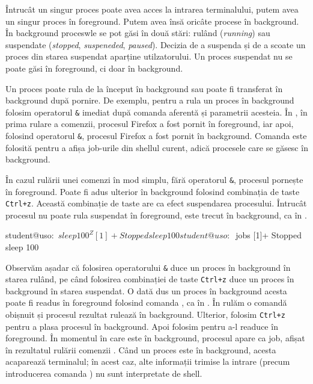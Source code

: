 Întrucât un singur proces poate avea acces la intrarea terminalului, putem avea un singur proces în foreground.
Putem avea însă oricâte procese în background.
În background proceswle se pot găsi în două stări: rulând (\textit{running}) sau suspendate (\textit{stopped}, \textit{suspeneded}, \textit{paused}).
Decizia de a suspenda și de a scoate un proces din starea suspendat aparține utilzatorului.
Un proces suspendat nu se poate găsi în foreground, ci doar în background.

Un proces poate rula de la început în background sau poate fi transferat în background după pornire.
De exemplu, pentru a rula un proces în background folosim operatorul \texttt{\&} imediat după comanda aferentă și parametrii acesteia.
În , în prima rulare a comenzii, procesul Firefox a fost pornit în foreground, iar apoi, folosind operatorul \texttt{\&}, procesul Firefox a fost pornit în background.
Comanda  este folosită pentru a afișa job-urile din shellul curent, adică procesele care se găsesc în background.


În cazul rulării unei comenzi în mod simplu, fără operatorul \texttt{\&}, procesul pornește în foreground.
Poate fi adus ulterior în background folosind combinația de taste \texttt{Ctrl+z}.
Această combinație de taste are ca efect suspendarea procesului.
Întrucât procesul nu poate rula suspendat în foreground, este trecut în background, ca în .

\begin{screen}[caption={Suspendarea unui process în background},escapechar=,label={lst:process:background-suspend}]
student@uso:~$ sleep 100
^Z
[1]+  Stopped                 sleep 100
student@uso:~$ jobs
[1]+  Stopped                 sleep 100
\end{screen}

Observăm așadar că folosirea operatorului \texttt{\&} duce un proces în background în starea rulând, pe când folosirea combinației de taste \texttt{Ctrl+z} duce un proces în background în starea suspendat.
O dată dus un proces în background acesta poate fi readus în foreground folosind comanda , ca în .
În  rulăm o comandă obișnuit și procesul rezultat rulează în background.
Ulterior, folosim \texttt{Ctrl+z} pentru a plasa procesul în background.
Apoi folosim  pentru a-l readuce în foreground.
În momentul în care este în background, procesul apare ca job, afișat în rezultatul rulării comenzii .
Când un proces este în background, acesta acaparează terminalul;
în acest caz, alte informații trimise la intrare (precum introducerea comanda ) nu sunt interpretate de shell.

